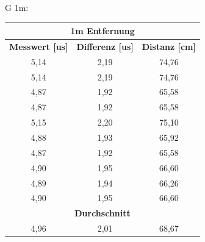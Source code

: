 G 1m:
\begin{table}[H]
\begin{tabular}{|c|c|c|}
\hline
\multicolumn{3}{|c|}{\textbf{1m Entfernung}}                                         \\ \hline
\textbf{Messwert {[}us{]}} & \textbf{Differenz {[}us{]}} & \textbf{Distanz {[}cm{]}} \\ \hline
5,14                       & 2,19                        & 74,76                     \\ \hline
5,14                       & 2,19                        & 74,76                     \\ \hline
4,87                       & 1,92                        & 65,58                     \\ \hline
4,87                       & 1,92                        & 65,58                     \\ \hline
5,15                       & 2,20                        & 75,10                     \\ \hline
4,88                       & 1,93                        & 65,92                     \\ \hline
4,87                       & 1,92                        & 65,58                     \\ \hline
4,90                       & 1,95                        & 66,60                     \\ \hline
4,89                       & 1,94                        & 66,26                     \\ \hline
4,90                       & 1,95                        & 66,60                     \\ \hline
\multicolumn{3}{|c|}{\textbf{Durchschnitt}}                                          \\ \hline
4,96                       & 2,01                        & 68,67                     \\ \hline
\end{tabular}
\end{table}








